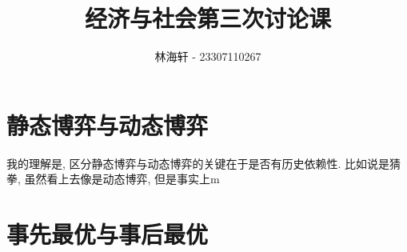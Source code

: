 \documentclass[a4paper,11pt]{amsart}
\title{经济与社会第三次讨论课}
\author{林海轩 - 23307110267}
\theoremstyle{definition}
\begin{document}
	
	\maketitle
	\section*{静态博弈与动态博弈}
	我的理解是, 区分静态博弈与动态博弈的关键在于是否有历史依赖性. 比如说是猜拳, 虽然看上去像是动态博弈, 但是事实上m
    \section*{事先最优与事后最优}
    
\end{document}
